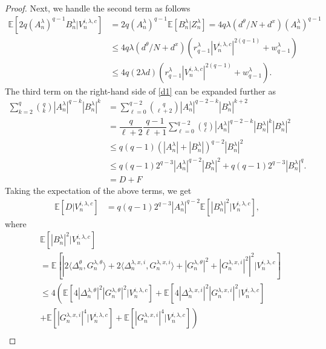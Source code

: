 \documentclass[a4paper, 10pt]{article}
\theoremstyle{plain}%
\begin{document}
\begin{proof}
\noindent Next, we handle the second term as follows
\begin{align}
\mathbb{E}\left[2q(A_n^{\lambda})^{q-1}B^{\lambda}_n|V^{i,\lambda,c}_{n}\right]&=2q(A_n^{\lambda})^{q-1}\mathbb{E}\left[B^{\lambda}_n|Z_n^{\lambda}\right]=4q\lambda\left(d^{\theta}/N+d^x\right)(A_n^{\lambda})^{q-1}\nonumber\\
&\leq 4q\lambda\left(d^{\theta}/N+d^x\right) \left(r_{q-1}^{\lambda}|V^{i,\lambda,c}_{n}|^{2(q-1)}+w_{q-1}^{\lambda}\right)\nonumber\\
&\leq  4q\left(2\lambda d\right) \left(r_{q-1}^{\lambda}|V^{i,\lambda,c}_{n}|^{2(q-1)}+w_{q-1}^{\lambda}\right).\label{d3}
\end{align}
The third term on the right-hand side of \eqref{d1} can be expanded further as
\begin{align}
\sum_{k=2}^q\binom{q}{k}|A_n^{\lambda}|^{q-k}|B^{\lambda}_n|^k&=\sum_{\ell=0}^{q-2}\binom{q}{\ell+2}|A_n^{\lambda}|^{q-2-k}|B^{\lambda}_n|^{k+2}\nonumber\\
&=\dfrac{q}{\ell+2}\dfrac{q-1}{\ell+1}\sum_{\ell=0}^{q-2}\binom{q}{\ell}|A_n^{\lambda}|^{q-2-k}|B^{\lambda}_n|^{k}|B^{\lambda}_n|^{2}\nonumber\\
&\leq q(q-1)\left(|A_n^{\lambda}|+|B_n^{\lambda}|\right)^{q-2}|B^{\lambda}_n|^2\nonumber\\
&\leq q(q-1)2^{q-3}|A_n^{\lambda}|^{q-2}|B_n^{\lambda}|^2+q(q-1)2^{q-3}|B_n^{\lambda}|^q.\nonumber\\
&=D+F \label{d4}
\end{align}
Taking the expectation of the above terms, we get
\begin{align*}
\mathbb{E}[D|V^{i,\lambda,c}_{n}]&=q(q-1)2^{q-3}|A_n^{\lambda}|^{q-2}\mathbb{E}\left[|B_n^{\lambda}|^2|V^{i,\lambda,c}_{n}\right],
\end{align*}
where
\begin{align*}
&\mathbb{E}\left[|B_n^{\lambda}|^2|V^{i,\lambda,c}_{n}\right]\\&=\mathbb{E}\left[\left|2\langle \Delta_n^{\theta},G_n^{\lambda,\theta}\rangle+2\langle \Delta_n^{\lambda,x,i},G_n^{\lambda,x,i}\rangle+|G_n^{\lambda,\theta}|^2+|G_n^{\lambda,x,i}|^2\right|^2|V^{i,\lambda,c}_{n} \right]\\
&\leq 4\left(\mathbb{E}\left[4|\Delta_n^{\lambda,\theta}|^2|G_n^{\lambda,\theta}|^2|V^{i,\lambda,c}_{n}\right]+\mathbb{E}\left[4|\Delta_n^{\lambda,x,i}|^2|G_n^{\lambda,x,i}|^2|V^{i,\lambda,c}_{n}\right]\right.\\
&+\left.\mathbb{E}\left[|G_n^{\lambda,x,i}|^4|V^{i,\lambda,c}_{n}\right]+\mathbb{E}\left[|G_n^{\lambda,x,i}|^4|V^{i,\lambda,c}_{n}\right]\right)\\

\end{align*}
\end{proof}
\end{document}
